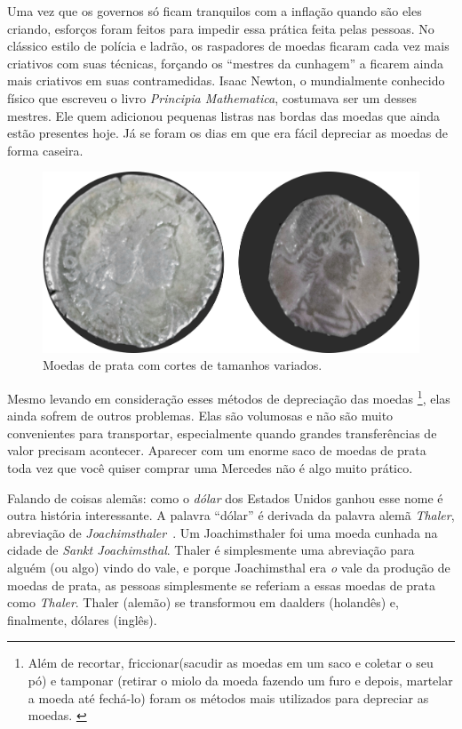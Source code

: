 Uma vez que os governos só ficam tranquilos com a inflação quando são eles criando, esforços foram feitos para impedir essa prática feita pelas pessoas. No clássico estilo de polícia e ladrão, os raspadores de moedas ficaram cada vez mais criativos com suas técnicas, forçando os \enquote{mestres da cunhagem} a ficarem ainda mais criativos em suas contramedidas. Isaac Newton, o mundialmente conhecido físico que escreveu o livro \textit{Principia Mathematica}, costumava ser um desses mestres. Ele quem adicionou pequenas listras nas bordas das moedas que ainda estão presentes hoje. Já se foram os dias em que era fácil depreciar as moedas de forma caseira.

\begin{figure}
  \includegraphics{assets/images/clipped-coins.png}
  \caption{Moedas de prata com cortes de tamanhos variados.}
  \label{fig:clipped-coins}
\end{figure}

Mesmo levando em consideração esses métodos de depreciação das moedas \footnote{Além de recortar, friccionar(sacudir as moedas em um saco e coletar o seu pó) e tamponar (retirar o miolo da moeda fazendo um furo e depois, martelar a moeda até fechá-lo) foram os métodos mais utilizados para depreciar as moedas. \cite{wiki:coin-debasement}}, elas ainda sofrem de outros problemas. Elas são volumosas e não são muito convenientes para transportar, especialmente quando grandes transferências de valor precisam acontecer. Aparecer com um enorme saco de moedas de prata toda vez que você quiser comprar uma Mercedes não é algo muito prático.

Falando de coisas alemãs: como o \textit{dólar} dos Estados Unidos ganhou esse nome é outra história interessante. A palavra \enquote{dólar} é derivada da palavra alemã \textit{Thaler}, abreviação de \textit{Joachimsthaler}~\cite{wiki:thaler}. Um Joachimsthaler foi uma moeda cunhada na cidade de \textit{Sankt Joachimsthal}. Thaler é simplesmente uma abreviação para alguém (ou algo) vindo do vale, e porque Joachimsthal era \textit{o} vale da produção de moedas de prata, as pessoas simplesmente se referiam a essas moedas de prata como \textit{Thaler}. Thaler (alemão) se transformou em daalders (holandês) e, finalmente, dólares (inglês).

